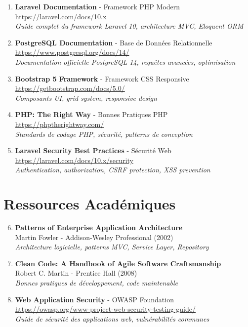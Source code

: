 \documentclass[12pt, a4paper, twoside, openany]{report}
\begin{document}
\begin{enumerate}
    \item \textbf{Laravel Documentation} - Framework PHP Modern \\
    \url{https://laravel.com/docs/10.x} \\
    \textit{Guide complet du framework Laravel 10, architecture MVC, Eloquent ORM}
    
    \item \textbf{PostgreSQL Documentation} - Base de Données Relationnelle \\
    \url{https://www.postgresql.org/docs/14/} \\
    \textit{Documentation officielle PostgreSQL 14, requêtes avancées, optimisation}
    
    \item \textbf{Bootstrap 5 Framework} - Framework CSS Responsive \\
    \url{https://getbootstrap.com/docs/5.0/} \\
    \textit{Composants UI, grid system, responsive design}
    
    \item \textbf{PHP: The Right Way} - Bonnes Pratiques PHP \\
    \url{https://phptherightway.com/} \\
    \textit{Standards de codage PHP, sécurité, patterns de conception}
    
    \item \textbf{Laravel Security Best Practices} - Sécurité Web \\
    \url{https://laravel.com/docs/10.x/security} \\
    \textit{Authentication, authorization, CSRF protection, XSS prevention}
\end{enumerate}

\section*{Ressources Académiques}

\begin{enumerate}
    \setcounter{enumi}{5}
    \item \textbf{Patterns of Enterprise Application Architecture} \\
    Martin Fowler - Addison-Wesley Professional (2002) \\
    \textit{Architecture logicielle, patterns MVC, Service Layer, Repository}
    
    \item \textbf{Clean Code: A Handbook of Agile Software Craftsmanship} \\
    Robert C. Martin - Prentice Hall (2008) \\
    \textit{Bonnes pratiques de développement, code maintenable}
    
    \item \textbf{Web Application Security} - OWASP Foundation \\
    \url{https://owasp.org/www-project-web-security-testing-guide/} \\
    \textit{Guide de sécurité des applications web, vulnérabilités communes}
\end{enumerate}
\end{document}
